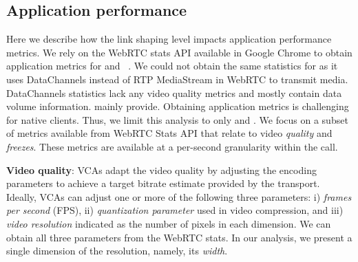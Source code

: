 \subsection{Application performance}
\label{subsec:application_performance}
Here we describe how the link shaping level impacts application performance metrics. %
We rely on the WebRTC stats API available in Google Chrome to obtain application metrics for \teamsbrowser and \meet~\cite{webrtc_stats}. We could not obtain the same statistics for \zoombrowser as it uses DataChannels instead of RTP MediaStream in WebRTC to transmit media. DataChannels statistics lack any video quality metrics and mostly contain data volume information. mainly provide. Obtaining application metrics is challenging for native clients.  %
Thus, we limit this analysis to only \meet and \teamsbrowser. We focus on a subset of metrics available from WebRTC Stats API that relate to video \textit{quality} and \textit{freezes}. These metrics are available at a per-second granularity within the call. %


\textbf{Video quality}: VCAs adapt the video quality by adjusting the encoding parameters to achieve a target bitrate estimate provided by the transport. Ideally, VCAs can adjust one or more of the following three parameters: i) \emph{frames per second} (FPS), ii) \textit{quantization parameter} used in video compression, and  iii) \textit{video resolution} indicated as the number of pixels in each dimension. We can obtain all three parameters from the WebRTC stats. In our analysis, we present a single dimension of the resolution, namely, its \textit{width}. 

